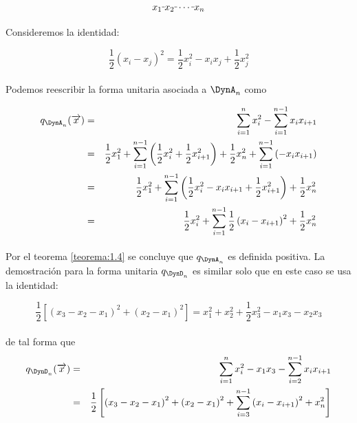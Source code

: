 $$x_{1}\rule[1mm]{.1cm}{0.4pt} x_{2} \rule[1mm]{.1cm}{0.4pt}\cdots\rule[1mm]{.1cm}{0.4pt} x_{n}$$

\paragraph{}
Consideremos  la identidad:

\begin{equation*}
    \frac{1}{2}\left(x_{i} - x_{j}\right)^{2} = \frac{1}{2}x_{i}^{2} - x_{i}x_{j} + \frac{1}{2}x_{j}^{2}
\end{equation*}

\paragraph{}
Podemos reescribir la forma unitaria asociada a $\DynA_{n}$ como

\begin{eqnarray*}
 q_{\DynA_{n}}(\overrightarrow{x}) &  =  & \sum_{i=1}^{n}x_{i}^{2} - \sum_{i=1}^{n-1} x_{i}x_{i+1}\\
 &  =  & \frac{1}{2}x_{1}^{2} + \sum_{i=1}^{n-1}\left(\frac{1}{2}x_{i}^{2} + \frac{1}{2} x_{i+1}^{2}\right) + \frac{1}{2}x_{n}^{2} + \sum_{i=1}^{n-1} \left(-x_{i}x_{i+1}\right)\\
 &  =  & \frac{1}{2}x_{1}^{2} + \sum_{i=1}^{n-1}\left(\frac{1}{2}x_{i}^{2} - x_{i}x_{i+1} + \frac{1}{2}x_{i+1}^{2} \right) + \frac{1}{2}x_{n}^{2}\\
 &  =  & \frac{1}{2}x_{i}^{2} + \sum_{i=1}^{n-1}\frac{1}{2}\left(x_{i} - x_{i+1}\right)^{2} + \frac{1}{2}x_{n}^{2}
\end{eqnarray*}

\paragraph{}
Por el teorema \ref{teorema:1.4} se concluye que $q_{\DynA_{n}}$ es definida positiva. La demostración para la forma unitaria $q_{\DynD_{n}}$ es similar solo que en este caso se usa la identidad:

\begin{equation*}
    \frac{1}{2}\left[\left(x_{3} - x_{2} - x_{1}\right)^{2} + \left(x_{2} - x_{1}\right)^{2}\right] = x_{1}^{2} + x_{2}^{2} + \frac{1}{2}x_{3}^{2} - x_{1}x_{3} - x_{2}x_{3}
\end{equation*}

\paragraph{}
de tal forma que 
\begin{eqnarray*}
 q_{\DynD_{n}}(\overrightarrow{x}) &  =  & \sum_{i=1}^{n}x_{i}^{2} - x_{1}x_{3} -  \sum_{i=2}^{n-1} x_{i}x_{i+1}\\
 &  =  & \frac{1}{2}\left[\left(x_{3} - x_{2} - x_{1}\right)^{2} + \left(x_{2} - x_{1}\right)^{2} + \sum_{i=3}^{n-1}\left(x_{i} - x_{i+1}\right)^{2}  + x_{n}^{2}\right]
\end{eqnarray*}

